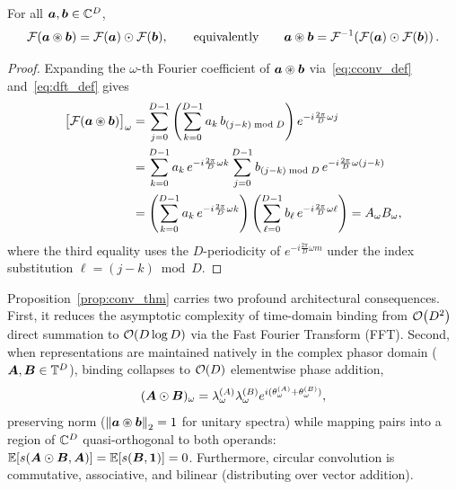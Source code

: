 \begin{proposition}\label{prop:conv_thm}
For all $\boldsymbol{a}, \boldsymbol{b} \in \mathbb{C}^D$,
\begin{equation}\label{eq:cconv_fft}
    \mathcal{F}(\boldsymbol{a} \circledast \boldsymbol{b}) = \mathcal{F}(\boldsymbol{a}) \odot \mathcal{F}(\boldsymbol{b}),
    \qquad\text{equivalently}\qquad
    \boldsymbol{a} \circledast \boldsymbol{b} = \mathcal{F}^{-1}\!\left(\mathcal{F}(\boldsymbol{a}) \odot \mathcal{F}(\boldsymbol{b})\right).
\end{equation}
\end{proposition}

\begin{proof}
Expanding the $\omega$-th Fourier coefficient of $\boldsymbol{a} \circledast \boldsymbol{b}$ via~\eqref{eq:cconv_def} and~\eqref{eq:dft_def} gives
\begin{align}
    \big[\mathcal{F}(\boldsymbol{a} \circledast \boldsymbol{b})\big]_\omega
    &= \sum_{j=0}^{D-1} \left( \sum_{k=0}^{D-1} a_k \, b_{(j - k) \bmod D} \right) e^{-i \frac{2\pi}{D}\omega j} \nonumber \\
    &= \sum_{k=0}^{D-1} a_k \, e^{-i \frac{2\pi}{D}\omega k}
       \sum_{j=0}^{D-1} b_{(j - k) \bmod D} \, e^{-i \frac{2\pi}{D}\omega (j - k)} \nonumber \\
    &= \left(\sum_{k=0}^{D-1} a_k \, e^{-i \frac{2\pi}{D}\omega k}\right)
       \left(\sum_{\ell=0}^{D-1} b_\ell \, e^{-i \frac{2\pi}{D}\omega \ell}\right)
     = A_\omega B_\omega, \label{eq:conv_proof}
\end{align}
where the third equality uses the $D$-periodicity of $e^{-i \frac{2\pi}{D}\omega m}$ under the index substitution $\ell = (j - k) \bmod D$.
\end{proof}

Proposition~\ref{prop:conv_thm} carries two profound architectural consequences.
First, it reduces the asymptotic complexity of time-domain binding from $\mathcal{O}\!\left(D^2\right)$ direct summation to $\mathcal{O}\!\left(D \log D\right)$ via the Fast Fourier Transform (FFT).
Second, when representations are maintained natively in the complex phasor domain ($\boldsymbol{A}, \boldsymbol{B} \in \mathbb{T}^D$), binding collapses to $\mathcal{O}\!\left(D\right)$ elementwise phase addition,
\begin{equation}\label{eq:phase_binding}
    (\boldsymbol{A} \odot \boldsymbol{B})_\omega = \lambda_\omega^{(A)} \lambda_\omega^{(B)} e^{i(\theta_\omega^{(A)} + \theta_\omega^{(B)})},
\end{equation}
preserving norm ($\left\lVert \boldsymbol{a} \circledast \boldsymbol{b} \right\rVert_2 = 1$ for unitary spectra) while mapping pairs into a region of $\mathbb{C}^D$ quasi-orthogonal to both operands: $\mathbb{E}[s(\boldsymbol{A} \odot \boldsymbol{B}, \boldsymbol{A})] = \mathbb{E}[s(\boldsymbol{B}, \boldsymbol{1})] = 0$.
Furthermore, circular convolution is commutative, associative, and bilinear (distributing over vector addition).

